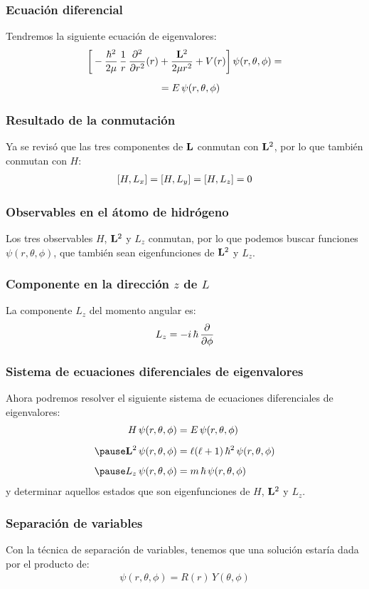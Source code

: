 \documentclass[12pt]{beamer}
\begin{document}
\begin{frame}
\frametitle{Ecuación diferencial}
Tendremos la siguiente ecuación de eigenvalores:
\pause
\begin{align}
\begin{aligned}
\bigg[ - \dfrac{\hbar^{2}}{2 \mu} \, \dfrac{1}{r} \, \pdv[2]{r} (r) &+ \dfrac{\vb{L}^{2}}{2 \mu r^{2}} + V (r) \bigg] \, \psi (r, \theta, \phi) = \\[0.5em]
&= E \, \psi (r, \theta, \phi) 
\end{aligned}
\label{eq:ecuacion_08_01_02}
\end{align}
\end{frame}
\begin{frame}
\frametitle{Resultado de la conmutación}
Ya se revisó que las tres componentes de $\vb{L}$ conmutan con $\vb{L}^{2}$, por lo que también conmutan con $H$:
\pause
\begin{align}
\comm{H}{L_{x}} = \comm{H}{L_{y}} = \comm{H}{L_{z}} = 0
\label{eq:ecuacion_08_04}
\end{align}
\end{frame}
\begin{frame}
\frametitle{Observables en el átomo de hidrógeno}
Los tres observables $H$, $\vb{L}^{2}$ y $L_{z}$ conmutan, por lo que podemos buscar funciones $\psi (r, \theta, \phi)$, que también sean eigenfunciones de $\vb{L}^{2}$ y $L_{z}$.
\end{frame}
\begin{frame}
\frametitle{Componente en la dirección $z$ de $L$}
La componente $L_{z}$ del momento angular es:
\pause
\begin{align*}
L_{z} = - i \, \hbar \, \pdv{\phi}
\end{align*}
\end{frame}
\begin{frame}
\frametitle{Sistema de ecuaciones diferenciales de eigenvalores}
Ahora podremos resolver el siguiente sistema de ecuaciones diferenciales de eigenvalores:
\begin{eqnarray}
\begin{aligned}
H \, \psi (r, \theta, \phi) &= E \, \psi (r, \theta, \phi) \label{eq:ecuacion_08_05} \\[0.5em] \pause
\vb{L}^{2} \, \psi (r, \theta, \phi) &= \ell (\ell + 1) \, \hbar^{2} \, \psi (r, \theta, \phi) \label{eq:ecuacion_08_06} \\[0.5em] \pause
L_{z} \, \psi (r, \theta, \phi) &= m \, \hbar \, \psi (r, \theta, \phi) \label{eq:ecuacion_08_07}
\end{aligned}
\end{eqnarray}
\pause
y determinar aquellos estados que son eigenfunciones de $H$, $\vb{L}^{2}$ y $L_{z}$.
\end{frame}
\begin{frame}
\frametitle{Separación de variables}
Con la técnica de separación de variables, tenemos que una solución estaría dada por el producto de:
\pause
\begin{align}
\psi (r, \theta, \phi) = R (r) \, Y (\theta, \phi)
\label{eq:ecuacion_08_08}
\end{align}
\end{frame}
\end{document}
